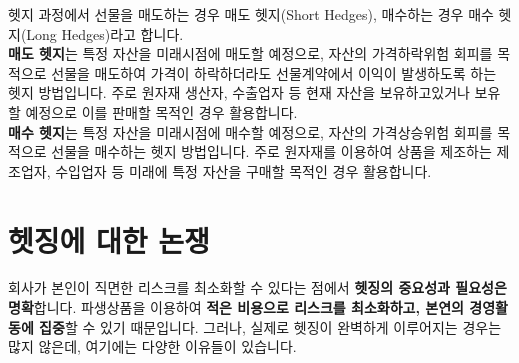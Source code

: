 \documentclass[
  letterpaper,
  DIV=11,
  numbers=noendperiod]{scrreprt}
\begin{document}
\begin{tcolorbox}[enhanced jigsaw, toprule=.15mm, breakable, left=2mm, leftrule=.75mm, opacitybacktitle=0.6, coltitle=black, rightrule=.15mm, colback=white, titlerule=0mm, bottomtitle=1mm, colframe=quarto-callout-tip-color-frame, title=\textcolor{quarto-callout-tip-color}{\faLightbulb}\hspace{0.5em}{매도 헷지 vs.~매수 헷지}, toptitle=1mm, arc=.35mm, colbacktitle=quarto-callout-tip-color!10!white, opacityback=0, bottomrule=.15mm]

헷지 과정에서 선물을 매도하는 경우 매도 헷지(Short Hedges), 매수하는
경우 매수 헷지(Long Hedges)라고 합니다.\\
\textbf{매도 헷지}는 특정 자산을 미래시점에 매도할 예정으로, 자산의
가격하락위험 회피를 목적으로 선물을 매도하여 가격이 하락하더라도
선물계약에서 이익이 발생하도록 하는 헷지 방법입니다. 주로 원자재 생산자,
수출업자 등 현재 자산을 보유하고있거나 보유할 예정으로 이를 판매할
목적인 경우 활용합니다.\\
\textbf{매수 헷지}는 특정 자산을 미래시점에 매수할 예정으로, 자산의
가격상승위험 회피를 목적으로 선물을 매수하는 헷지 방법입니다. 주로
원자재를 이용하여 상품을 제조하는 제조업자, 수입업자 등 미래에 특정
자산을 구매할 목적인 경우 활용합니다.

\end{tcolorbox}

\section*{헷징에 대한
논쟁}\label{uxd5f7uxc9d5uxc5d0-uxb300uxd55c-uxb17cuxc7c1}


회사가 본인이 직면한 리스크를 최소화할 수 있다는 점에서 \textbf{헷징의
중요성과 필요성은 명확}합니다. 파생상품을 이용하여 \textbf{적은 비용으로
리스크를 최소화하고, 본연의 경영활동에 집중}할 수 있기 때문입니다.
그러나, 실제로 헷징이 완벽하게 이루어지는 경우는 많지 않은데, 여기에는
다양한 이유들이 있습니다.
\end{document}
